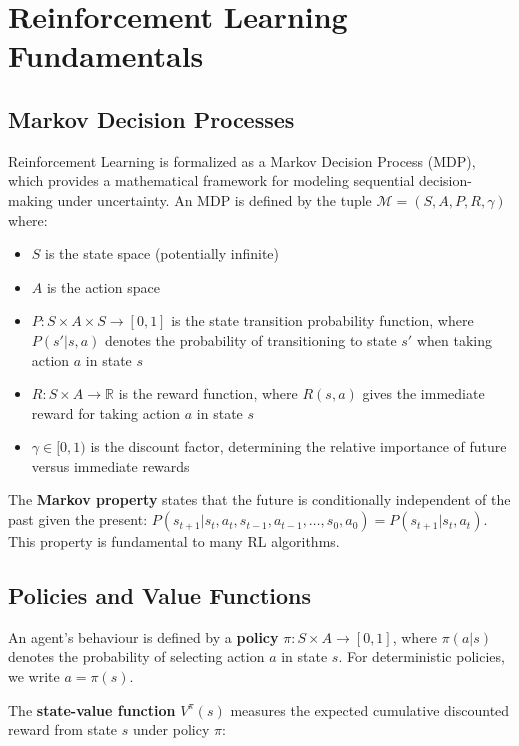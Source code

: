 \documentclass[12pt,a4paper]{report}
\begin{document}
\section{Reinforcement Learning Fundamentals}

\subsection{Markov Decision Processes}

Reinforcement Learning is formalized as a Markov Decision Process (MDP), which provides a mathematical framework for modeling sequential decision-making under uncertainty. An MDP is defined by the tuple $\mathcal{M} = (S, A, P, R, \gamma)$ where:

\begin{itemize}
    \item $S$ is the state space (potentially infinite)
    \item $A$ is the action space
    \item $P: S \times A \times S \rightarrow [0,1]$ is the state transition probability function, where $P(s'|s,a)$ denotes the probability of transitioning to state $s'$ when taking action $a$ in state $s$
    \item $R: S \times A \rightarrow \mathbb{R}$ is the reward function, where $R(s,a)$ gives the immediate reward for taking action $a$ in state $s$
    \item $\gamma \in [0,1)$ is the discount factor, determining the relative importance of future versus immediate rewards
\end{itemize}

The \textbf{Markov property} states that the future is conditionally independent of the past given the present: $P(s_{t+1}|s_t, a_t, s_{t-1}, a_{t-1}, \ldots, s_0, a_0) = P(s_{t+1}|s_t, a_t)$. This property is fundamental to many RL algorithms.

\subsection{Policies and Value Functions}

An agent's behaviour is defined by a \textbf{policy} $\pi: S \times A \rightarrow [0,1]$, where $\pi(a|s)$ denotes the probability of selecting action $a$ in state $s$. For deterministic policies, we write $a = \pi(s)$.

The \textbf{state-value function} $V^\pi(s)$ measures the expected cumulative discounted reward from state $s$ under policy $\pi$:
\end{document}
